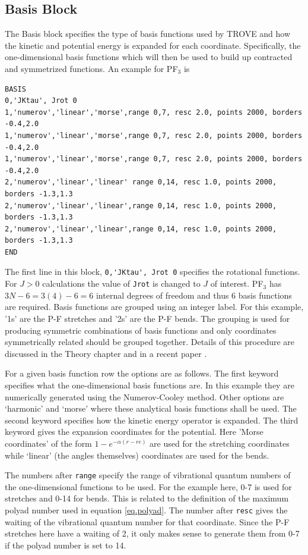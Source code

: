 \subsection{Basis Block}
The Basis block specifies the type of basis functions used by TROVE and how the kinetic and potential energy is expanded
for each coordinate.
Specifically, the one-dimensional basis functions which will then be used to build up contracted and symmetrized functions. 
An example for PF$_3$ is 
\begin{verbatim}
BASIS
0,'JKtau', Jrot 0
1,'numerov','linear','morse',range 0,7, resc 2.0, points 2000, borders -0.4,2.0
1,'numerov','linear','morse',range 0,7, resc 2.0, points 2000, borders -0.4,2.0
1,'numerov','linear','morse',range 0,7, resc 2.0, points 2000, borders -0.4,2.0
2,'numerov','linear','linear' range 0,14, resc 1.0, points 2000, borders -1.3,1.3
2,'numerov','linear','linear',range 0,14, resc 1.0, points 2000, borders -1.3,1.3
2,'numerov','linear','linear',range 0,14, resc 1.0, points 2000, borders -1.3,1.3
END
\end{verbatim}
The first line in this block, \verb|0,'JKtau', Jrot 0| specifies the rotational functions. 
For $J>0$ calculations the value of \verb|Jrot| is changed to $J$ of interest.
PF$_3$ has $3N - 6 = 3(4) - 6 = 6$ internal degrees of freedom and thus 6 basis functions are required. 
Basis functions are grouped using an integer label.
For this example, '1s' are the P-F stretches and '2s' are the P-F bends. The grouping is used for producing symmetric 
combinations of basis functions and only coordinates symmetrically related should be grouped together. Details of this
procedure are discussed in the Theory chapter and in a recent paper \cite{17YuYaOv.methods}.

For a given basis function row the options are as follows. The first keyword specifies what the one-dimensional basis 
functions are. In this example they are numerically generated using the Numerov-Cooley method. 
Other options are `harmonic' and `morse' where these analytical basis functions shall be used.
The second keyword specifies how the kinetic energy operator is expanded.
The third keyword gives the expansion coordinates for the potential. Here 'Morse coordinates' of the form
 $1 - e^{-\alpha(r-re)}$ are used for the stretching coordinates while `linear' (the angles themselves) 
coordinates are used for the bends.

The numbers after \verb|range| specify the range of vibrational quantum numbers of the one-dimensional functions to be used.
 For the example here, 0-7 is used for stretches and 0-14 for bends.
This is related to the definition of the maximum polyad number used in equation \ref{eq.polyad}. The number after \verb|resc|
gives the waiting of the vibrational quantum number for that coordinate. 
Since the P-F stretches here have a waiting of 2, it only makes sense to generate them from 0-7 if the
polyad number is set to 14.


